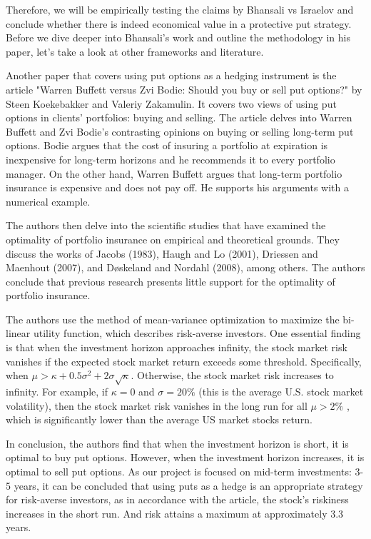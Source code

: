 \documentclass[12pt]{article}
\begin{document}
{{Therefore, we will be empirically testing the claims by Bhansali vs Israelov and conclude whether there is indeed economical value in a protective put strategy. Before we dive deeper into Bhansali’s work and outline the methodology in his paper, let’s take a look at other frameworks and literature. 
	
\qquad Another paper that covers using put options as a hedging instrument is the article "Warren Buffett versus Zvi Bodie: Should you buy or sell put options?" by Steen Koekebakker and Valeriy Zakamulin. It covers two views of using put options in clients’ portfolios: buying and selling. The article delves into Warren Buffett and Zvi Bodie's contrasting opinions on buying or selling long-term put options. Bodie argues that the cost of insuring a portfolio at expiration is inexpensive for long-term horizons and he recommends it to every portfolio manager. On the other hand, Warren Buffett argues that long-term portfolio insurance is expensive and does not pay off. He supports his arguments with a numerical example. 

\qquad The authors then delve into the scientific studies that have examined the optimality of portfolio insurance on empirical and theoretical grounds. They discuss the works of Jacobs (1983), Haugh and Lo (2001), Driessen and Maenhout (2007), and Døskeland and Nordahl (2008), among others. The authors conclude that previous research presents little support for the optimality of portfolio insurance.

\qquad The authors use the method of mean-variance optimization to maximize the bi-linear utility function, which describes risk-averse investors. One essential finding is that when the investment horizon approaches infinity, the stock market risk vanishes if the expected stock market return exceeds some threshold. Specifically, when $\mu > \kappa +0.5\sigma^2 + 2\sigma\sqrt{\kappa}$. Otherwise, the stock market risk increases to infinity. For example, if $\kappa = 0$ and $\sigma = 20\%$  (this is the average U.S. stock market volatility), then the stock market risk vanishes in the long run for all $\mu>2\%$ , which is significantly lower than the average US market stocks return.

\qquad In conclusion, the authors find that when the investment horizon is short, it is optimal to buy put options. However, when the investment horizon increases, it is optimal to sell put options. As our project is focused on mid-term investments: 3-5 years, it can be concluded that using puts as a hedge is an appropriate strategy for risk-averse investors, as in accordance with the article, the stock’s riskiness increases in the short run. And risk attains a maximum at approximately 3.3 years. 

}}
\end{document}
